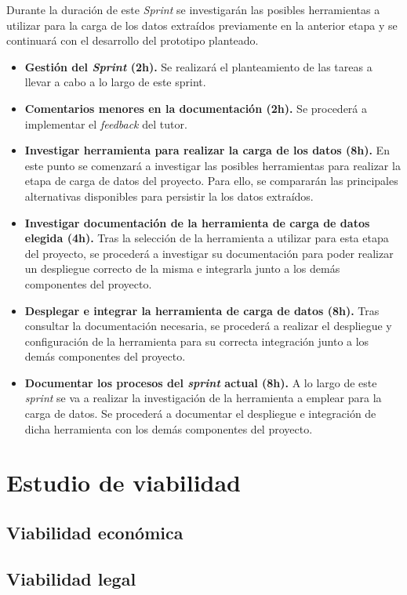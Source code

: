 Durante la duración de este \textit{Sprint} se investigarán las posibles herramientas a utilizar para la carga de los datos extraídos previamente en la anterior etapa y se continuará con el desarrollo del prototipo planteado.

\begin{itemize}

    \item \textbf{Gestión del \textit{Sprint} (2h).} Se realizará el planteamiento de las tareas a llevar a cabo a lo largo de este sprint.

    \item \textbf{Comentarios menores en la documentación (2h).} Se procederá a implementar el \textit{feedback} del tutor.

    \item \textbf{Investigar herramienta para realizar la carga de los datos (8h).} En este punto se comenzará a investigar las posibles herramientas para realizar la etapa de carga de datos del proyecto. Para ello, se compararán las principales alternativas disponibles para persistir la los datos extraídos.

    \item \textbf{Investigar documentación de la herramienta de carga de datos elegida (4h).} Tras la selección de la herramienta a utilizar para esta etapa del proyecto, se procederá a investigar su documentación para poder realizar un despliegue correcto de la misma e integrarla junto a los demás componentes del proyecto.

    \item \textbf{Desplegar e integrar la herramienta de carga de datos (8h).} Tras consultar la documentación necesaria, se procederá a realizar el despliegue y configuración de la herramienta para su correcta integración junto a los demás componentes del proyecto.

    \item \textbf{Documentar los procesos del \textit{sprint} actual (8h).} A lo largo de este \textit{sprint} se va a realizar la investigación de la herramienta a emplear para la carga de datos. Se procederá a documentar el despliegue e integración de dicha herramienta con los demás componentes del proyecto.

\end{itemize}

\section{Estudio de viabilidad}

\subsection{Viabilidad económica}

\subsection{Viabilidad legal}


